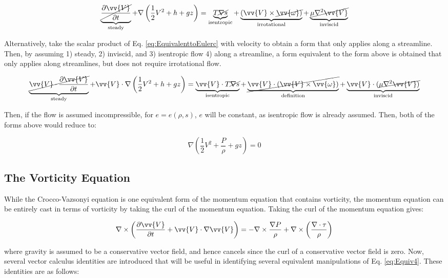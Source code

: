 \documentclass[10pt]{article}
\newcommand{\beq}{\begin{equation}}
\newcommand{\eeq}{\end{equation}}
\begin{document}
\begin{flushleft}
\beq
\label{eq:Bernoulli1}
\underbrace{\cancel{\frac{\partial \vv{V}}{\partial t}}}_{\textrm{steady}}+\nabla\left(\frac{1}{2}V^2+h+gz\right)=\underbrace{T\cancel{\nabla s}}_{\text{isentropic}}+\underbrace{(\vv{V}\times\cancel{\vv{\omega})}}_{\text{irrotational}}+\underbrace{\cancel{\mu\nabla^2\vv{V}}}_{\text{inviscid}}
\eeq

Alternatively, take the scalar product of Eq. \ref{eq:EquivalenttoEulerc} with velocity to obtain a form that only applies along a streamline. Then, by assuming 1) steady, 2) inviscid, and 3) isentropic flow 4) along a streamline, a form equivalent to the form above is obtained that only applies along streamlines, but does not require irrotational flow.

\beq
\label{eq:Bernoulli2}
\underbrace{\cancel{\vv{V}\cdot\frac{\partial \vv{V}}{\partial t}}}_{\text{steady}}+\vv{V}\cdot\nabla\left(\frac{1}{2}V^2+h+gz\right)=\underbrace{\vv{V}\cdot T\cancel{\nabla s}}_{\text{isentropic}}+\underbrace{\cancel{\vv{V}\cdot(\vv{V}\times\vv{\omega})}}_{\text{definition}}+\underbrace{\vv{V}\cdot(\cancel{\mu\nabla^2\vv{V})}}_{\text{inviscid}}
\eeq

Then, if the flow is assumed incompressible, for \(e=e(\rho,s)\), \(e\) will be constant, as isentropic flow is already assumed. Then, both of the forms above would reduce to:

\beq
\label{eq:Bernoulli3}
\nabla\left(\frac{1}{2}V^2+\frac{P}{\rho}+gz\right)=0
\eeq

\subsection{The Vorticity Equation}

While the Crocco-Vazsonyi equation is one equivalent form of the momentum equation that contains vorticity, the momentum equation can be entirely cast in terms of vorticity by taking the curl of the momentum equation. Taking the curl of the momentum equation gives:

\beq
\label{eq:Equiv4}
\nabla\times\left(\frac{\partial \vv{V}}{\partial t}+\vv{V}\cdot\nabla\vv{V}\right)=-\nabla\times\frac{\nabla P}{\rho}+\nabla\times\left(\frac{\nabla\cdot\tau}{\rho}\right)
\eeq

where gravity is assumed to be a conservative vector field, and hence cancels since the curl of a conservative vector field is zero. Now, several vector calculus identities are introduced that will be useful in identifying several equivalent manipulations of Eq. \eqref{eq:Equiv4}. These identities are as follows:


\end{flushleft}
\end{document}
